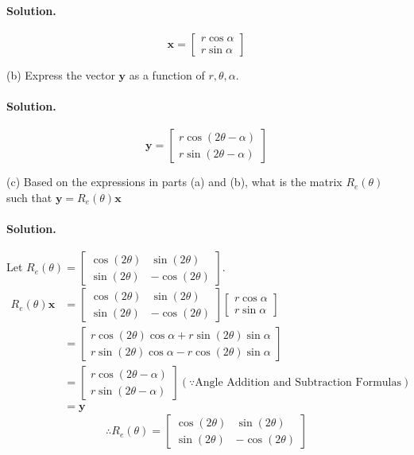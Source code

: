 \paragraph{Solution.}
$$\mathbf{x} = \begin{bmatrix}
    r\cos\alpha\\r\sin\alpha
\end{bmatrix}$$

(b) Express the vector $\mathbf{y}$ as a function of $r,\theta,\alpha$.
\paragraph{Solution.}
$$\mathbf{y} = \begin{bmatrix}
    r\cos(2\theta-\alpha)\\r\sin(2\theta-\alpha)
\end{bmatrix}$$

(c) Based on the expressions in parts (a) and (b), what is the matrix $R_e(\theta)$ such that $\mathbf{y}=R_e(\theta)\mathbf{x}$
\paragraph{Solution.}
Let $R_e(\theta) = \begin{bmatrix}
    \cos(2\theta) & \sin(2\theta)\\
    \sin(2\theta) & -\cos(2\theta)
\end{bmatrix}$.
\begin{align*}
    R_e(\theta)\mathbf{x} &= \begin{bmatrix}
        \cos(2\theta) & \sin(2\theta)\\
        \sin(2\theta) & -\cos(2\theta)
    \end{bmatrix} \begin{bmatrix}
        r\cos\alpha\\r\sin\alpha
    \end{bmatrix}\\
    &= \begin{bmatrix}
        r\cos(2\theta)\cos\alpha + r\sin(2\theta)\sin\alpha\\
        r\sin(2\theta)\cos\alpha - r\cos(2\theta)\sin\alpha
    \end{bmatrix}\\
    &= \begin{bmatrix}
        r\cos(2\theta-\alpha)\\r\sin(2\theta-\alpha)
    \end{bmatrix} (\because \text{Angle Addition and Subtraction Formulas})\\
    &= \mathbf{y}
\end{align*}
$$\therefore R_e(\theta) = \begin{bmatrix}
    \cos(2\theta) & \sin(2\theta)\\
    \sin(2\theta) & -\cos(2\theta)
\end{bmatrix}$$

